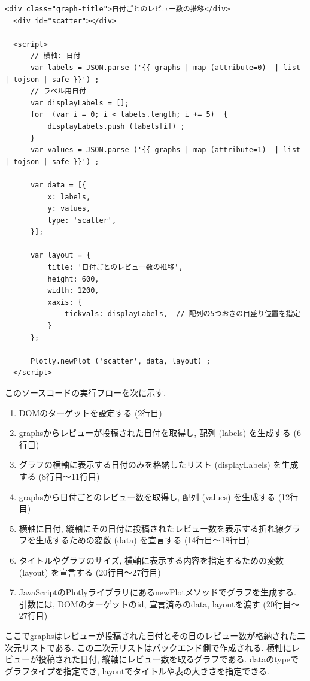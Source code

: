 \begin{lstlisting}[caption=detail.html, label=graph]
  <div class="graph-title">日付ごとのレビュー数の推移</div>
  <div id="scatter"></div>

  <script>
      // 横軸: 日付
      var labels = JSON.parse ('{{ graphs | map (attribute=0)  | list | tojson | safe }}') ;
      // ラベル用日付
      var displayLabels = [];
      for  (var i = 0; i < labels.length; i += 5)  {
          displayLabels.push (labels[i]) ;
      }
      var values = JSON.parse ('{{ graphs | map (attribute=1)  | list | tojson | safe }}') ;

      var data = [{
          x: labels,
          y: values,
          type: 'scatter',
      }];

      var layout = {
          title: '日付ごとのレビュー数の推移',
          height: 600,
          width: 1200,
          xaxis: {
              tickvals: displayLabels,  // 配列の5つおきの目盛り位置を指定
          }
      };

      Plotly.newPlot ('scatter', data, layout) ;
  </script>
\end{lstlisting}

このソースコードの実行フローを次に示す. 

\begin{enumerate}
  \item DOMのターゲットを設定する (2行目)
  \item graphsからレビューが投稿された日付を取得し, 配列 (labels) を生成する (6行目)
  \item グラフの横軸に表示する日付のみを格納したリスト (displayLabels) を生成する (8行目〜11行目)
  \item graphsから日付ごとのレビュー数を取得し, 配列 (values) を生成する (12行目)
  \item 横軸に日付, 縦軸にその日付に投稿されたレビュー数を表示する折れ線グラフを生成するための変数 (data) を宣言する (14行目〜18行目)
  \item タイトルやグラフのサイズ, 横軸に表示する内容を指定するための変数 (layout) を宣言する (20行目〜27行目)
  \item JavaScriptのPlotlyライブラリにあるnewPlotメソッドでグラフを生成する. 引数には, DOMのターゲットのid, 宣言済みのdata, layoutを渡す (20行目〜27行目)
\end{enumerate}
ここでgraphsはレビューが投稿された日付とその日のレビュー数が格納された二次元リストである. この二次元リストはバックエンド側で作成される. 
横軸にレビューが投稿された日付, 縦軸にレビュー数を取るグラフである. 
dataのtypeでグラフタイプを指定でき, layoutでタイトルや表の大きさを指定できる. 

